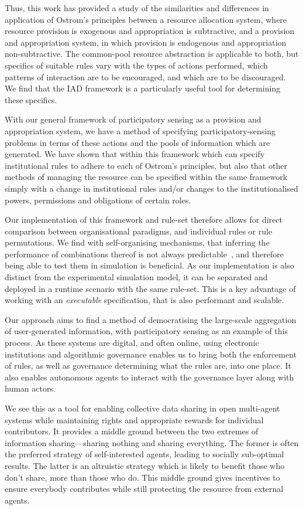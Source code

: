 Thus, this work has provided a study of the similarities and differences in
application of Ostrom's principles between a resource allocation system, where
resource provision is exogenous and appropriation is subtractive, and a
provision and appropriation system, in which provision is endogenous and
appropriation non-subtractive. The common-pool resource abstraction is
applicable to both, but specifics of suitable rules vary with the types of
actions performed, which patterns of interaction are to be encouraged, and
which are to be discouraged. We find that the \ac{IAD} framework is a
particularly useful tool for determining these specifics.

With our general framework of participatory sensing as a provision and
appropriation system, we have a method of specifying participatory-sensing
problems in terms of these actions and the pools of information which are
generated. We have shown that within this framework which can specify
institutional rules to adhere to each of Ostrom's principles, but also that
other methods of managing the resource can be specified within the same
framework simply with a change in institutional rules and/or changes to the
institutionalised powers, permissions and obligations of certain roles.

Our implementation of this framework and rule-set therefore allows for direct
comparison between organisational paradigms, and individual rules or rule
permutations. We find with self-organising mechanisms, that inferring the
performance of combinations thereof is not always
predictable~\citep{Sanderson2013}, and therefore being able to test them in
simulation is beneficial. As our implementation is also distinct from the
experimental simulation model, it can be separated and deployed in a runtime
scenario with the same rule-set. This is a key advantage of working with an
\emph{executable} specification, that is also performant and scalable.

Our approach aims to find a method of democratising the large-scale
aggregation of user-generated information, with participatory sensing as an
example of this process. As these systems are digital, and often online, using
electronic institutions and algorithmic governance enables us to bring both
the enforcement of rules, as well as governance determining what the rules
are, into one place. It also enables autonomous agents to interact with the
governance layer along with human actors.

We see this as a tool for enabling collective data sharing in open multi-agent
systems while maintaining rights and appropriate rewards for individual
contributors. It provides a middle ground between the two extremes of
information sharing---sharing nothing and sharing everything. The former is
often the preferred strategy of self-interested agents, leading to socially
sub-optimal results. The latter is an altruistic strategy which is likely to
benefit those who don't share, more than those who do. This middle ground gives
incentives to ensure everybody contributes while still protecting the resource
from external agents.

